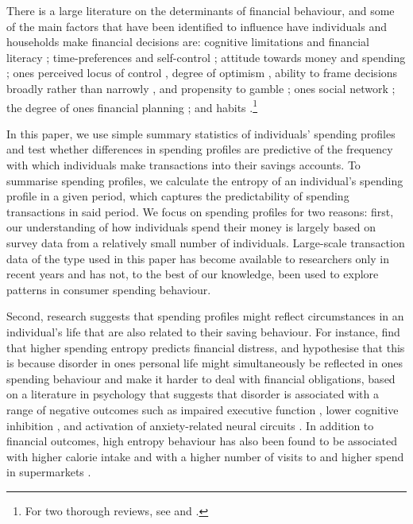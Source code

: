 There is a large literature on the determinants of financial behaviour, and
some of the main factors that have been identified to influence have
individuals and households make financial decisions are: cognitive limitations
and financial literacy \citep{agarwal2009age, agarwal2013cognitive,
    korniotis2011older, agarwal2010learning, fernandes2014financial,
    jorring2020financial}; time-preferences and self-control
    \citep{frederick2002time, read2018intertemporal, ericson2019intertemporal,
    cohen2020measuring}; attitude towards money and spending
    \citep{rick2008tightwads, rick2011fatal}; ones perceived locus of control
    \citep{perry2005control}, degree of optimism \citep{puri2007optimism},
    ability to frame decisions broadly rather than narrowly
    \citep{kumar2008decision}, and propensity to gamble
    \citep{kumar2009gambles}; ones social network \citep{bailey2018economic,
        kuchler2021social}; the degree of ones financial planning
        \citep{ameriks2003wealth}; and habits \citep{blumenstock2018defaults,
            schaner2018persistent, de2013deposit}.\footnote{For two thorough
        reviews, see \citet{agarwal2017shapes} and
    \citet{greenberg2019financial}.}

In this paper, we use simple summary statistics of individuals' spending
profiles and test whether differences in spending profiles are predictive of
the frequency with which individuals make transactions into their savings
accounts. To summarise spending profiles, we calculate the entropy of an
individual's spending profile in a given period, which captures the
predictability of spending transactions in said period. We focus on spending
profiles for two reasons: first, our understanding of how individuals spend
their money is largely based on survey data from a relatively small number of
individuals. Large-scale transaction data of the type used in this paper has
become available to researchers only in recent years and has not, to the best
of our knowledge, been used to explore patterns in consumer spending behaviour. 

Second, research suggests that spending profiles might reflect circumstances in
an individual's life that are also related to their saving behaviour. For
instance, \citet{muggleton2020evidence} find that higher spending entropy
predicts financial distress, and hypothesise that this is because disorder in
ones personal life might simultaneously be reflected in ones spending behaviour
and make it harder to deal with financial obligations, based on a literature in
psychology that suggests that disorder is associated with a range of negative
outcomes such as impaired executive function \citep{vernon2016predictors},
lower cognitive inhibition \citep{mittal2015cognitive}, and activation of
anxiety-related neural circuits \citep{hirsh2012psychological}. In addition to
financial outcomes, high entropy behaviour has also been found to be associated
with higher calorie intake \citep{skatova2019those} and with a higher number of
visits to and higher spend in supermarkets \citep{guidotti2015behavioral}.

